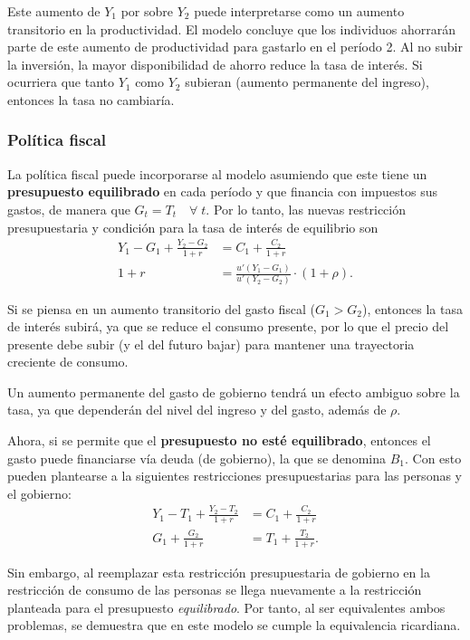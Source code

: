 \documentclass[DeGregorioResumen]{subfiles}
\begin{document}
Este aumento de  $Y_1$ por sobre $Y_2$ puede interpretarse como un aumento transitorio en la productividad. El modelo concluye que los individuos ahorrarán parte de este aumento de productividad para gastarlo en el período 2. Al no subir la inversión, la mayor disponibilidad de ahorro reduce la tasa de interés. Si ocurriera que tanto $Y_1$ como $Y_2$ subieran (aumento permanente del ingreso), entonces la tasa no cambiaría.

\subsubsection*{Política fiscal}

La política fiscal puede incorporarse al modelo asumiendo que este tiene un \textbf{presupuesto equilibrado} en cada período y que financia con impuestos sus gastos, de manera que $G_t=T_t \quad \forall \; t$. Por lo tanto, las nuevas restricción presupuestaria y condición para la tasa de interés de equilibrio son
\begin{align*}
	Y_1-G_1 + \frac{Y_2-G_2}{1+r} &= C_1 + \frac{C_2}{1+r} \\
	1+r &= \frac{u'(Y_1-G_1)}{u'(Y_2-G_2)} \cdot (1+\rho).
\end{align*}

Si se piensa en un aumento transitorio del gasto fiscal ($ G_1>G_2$), entonces la tasa de interés subirá, ya que se reduce el consumo presente, por lo que el precio del presente debe subir (y el del futuro bajar) para mantener una trayectoria creciente de consumo.

Un aumento permanente del gasto de gobierno tendrá un efecto ambiguo sobre la tasa, ya que dependerán del nivel del ingreso y del gasto, además de $\rho$.

Ahora, si se permite que el \textbf{presupuesto no esté equilibrado}, entonces el gasto puede financiarse vía deuda (de gobierno), la que se denomina $B_1$. Con esto pueden plantearse a la siguientes restricciones presupuestarias para las personas y el gobierno:
\begin{align*}
	Y_1-T_1 + \frac{Y_2-T_2}{1+r} &= C_1 + \frac{C_2}{1+r} \\
	G_1 + \frac{G_2}{1+r}& = T_1 + \frac{T_2}{1+r}.
\end{align*}

Sin embargo, al reemplazar esta restricción presupuestaria de gobierno en la restricción de consumo de las personas se llega nuevamente a la restricción planteada para el presupuesto \textit{equilibrado}. Por tanto, al ser equivalentes ambos problemas, se demuestra que en este modelo se cumple la equivalencia ricardiana.
\end{document}
